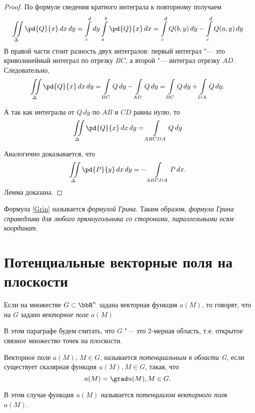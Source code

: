 \begin{proof}
По формуле сведения кратного интеграла к повторному получаем
$$
\iint\limits_{\Delta} \pd{Q}{x} \,dx\,dy = \int_{c}^{d}\limits dy \int_a^b\limits \pd{Q}{x}\,dx = \int_c^d\limits Q(b,y)\,dy - \int_c^d\limits Q(a,y)\,dy
$$
В правой части стоит разность двух интегралов: первый интеграл "--- это криволинейный интеграл по отрезку $BC$, а второй "--- интеграл отрезку $AD$. Следовательно,
$$
\iint\limits_\Delta\pd{Q}{x}\,dx\,dy = \int_{BC}\limits Q\,dy - \int_{AD}\limits Q\,dy = \int_{BC}\limits Q\,dy + \int_{DA}\limits Q\,dy.
$$

А так как интегралы от $Q\,dy$ по $AB$ и $CD$ равны нулю, то
$$
\iint\limits_\Delta\pd{Q}{x}\,dx\,dy = \int\limits_{ABCDA} Q\,dy
$$

Аналогично доказывается, что
$$
\iint\limits_\Delta\pd{P}{y}\,dx\,dy = -\int\limits_{ABCDA} P\,dx.  
$$
Лемма доказана.
\end{proof}
Формула \eqref{Grin} называется \textit{формулой Грина}. Таким образом, \textit{формула Грина справедлива для любого прямоугольника со сторонами, параллельными осям координат}.


\section{Потенциальные векторные поля на плоскости}

Если на множестве $G \subset \bbR^n$ задана векторная функция $a(M)$, то говорят, что на $G$ задано \textit{векторное поле} $a(M)$ 

В этом параграфе будем считать, что $G$ "--- это $2$-мерная область, т.е. открытое связное множество точек на плоскости.

\begin{defn}
Векторное поле $a(M)$, $M\in G$, называется \textit{потенциальным в области G}, если существует скалярная функция $u(M), M\in G$, такая, что 
$$
a(M) = \grad u(M), M \in G.
$$

В этом случае функция $u(M)$ называется \textit{потенциалом векторного поля} $a(M)$.
\end{defn}